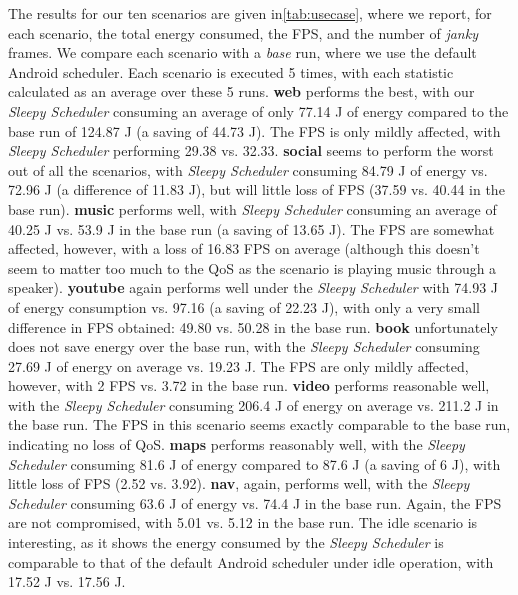 \documentclass[conference]{IEEEtran}
\begin{document}
\noindent 
The results for our ten scenarios are given in\cref{tab:usecase}, where we report, for each scenario, the total energy consumed, the FPS, and the number of \emph{janky} frames. We compare each scenario with a \emph{base} run, where we use the default Android scheduler. Each scenario is executed 5 times, with each statistic calculated as an average over these 5 runs. \textbf{web} performs the best, with our \emph{Sleepy Scheduler} consuming an average of only 77.14 J of energy compared to the base run of 124.87 J (a saving of 44.73 J). The FPS is only mildly affected, with \emph{Sleepy Scheduler} performing 29.38 vs. 32.33. \textbf{social} seems to perform the worst out of all the scenarios, with \emph{Sleepy Scheduler} consuming 84.79 J of energy vs. 72.96 J (a difference of 11.83 J), but will little loss of FPS (37.59 vs. 40.44 in the base run). \textbf{music} performs well, with \emph{Sleepy Scheduler} consuming an average of 40.25 J vs. 53.9 J in the base run (a saving of 13.65 J). The FPS are somewhat affected, however, with a loss of 16.83 FPS on average (although this doesn't seem to matter too much to the QoS as the scenario is playing music through a speaker). \textbf{youtube} again performs well under the \emph{Sleepy Scheduler} with 74.93 J of energy consumption vs. 97.16 (a saving of 22.23 J), with only a very small difference in FPS obtained: 49.80 vs. 50.28 in the base run. \textbf{book} unfortunately does not save energy over the base run, with the \emph{Sleepy Scheduler} consuming 27.69 J of energy on average vs. 19.23 J. The FPS are only mildly affected, however, with 2 FPS vs. 3.72 in the base run. \textbf{video} performs reasonable well, with the \emph{Sleepy Scheduler} consuming 206.4 J of energy on average vs. 211.2 J in the base run. The FPS in this scenario seems exactly comparable to the base run, indicating no loss of QoS. \textbf{maps} performs reasonably well, with the \emph{Sleepy Scheduler} consuming 81.6 J of energy compared to 87.6 J (a saving of 6 J), with little loss of FPS (2.52 vs. 3.92). \textbf{nav}, again, performs well, with the \emph{Sleepy Scheduler} consuming 63.6 J of energy vs. 74.4 J in the base run. Again, the FPS are not compromised, with 5.01 vs. 5.12 in the base run. The idle scenario is interesting, as it shows the energy consumed by the \emph{Sleepy Scheduler} is comparable to that of the default Android scheduler under idle operation, with 17.52 J vs. 17.56 J. 
\end{document}
